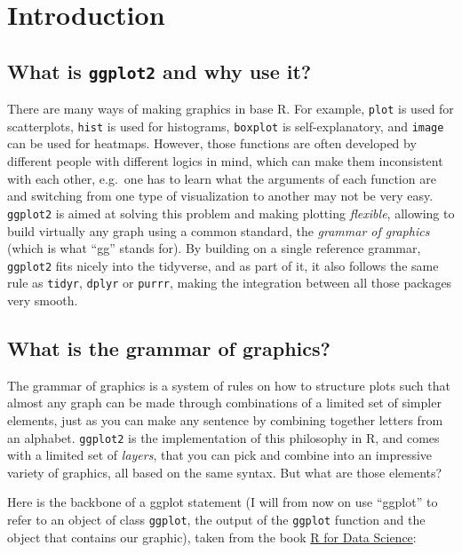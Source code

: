 \documentclass[]{book}
\begin{document}
\hypertarget{introduction}{%
\section{Introduction}\label{introduction}}

\hypertarget{what-is-ggplot2-and-why-use-it}{%
\subsection{\texorpdfstring{What is \texttt{ggplot2} and why use it?}{What is ggplot2 and why use it?}}\label{what-is-ggplot2-and-why-use-it}}

There are many ways of making graphics in base R. For example, \texttt{plot} is used for scatterplots, \texttt{hist} is used for histograms, \texttt{boxplot} is self-explanatory, and \texttt{image} can be used for heatmaps. However, those functions are often developed by different people with different logics in mind, which can make them inconsistent with each other, e.g.~one has to learn what the arguments of each function are and switching from one type of visualization to another may not be very easy. \texttt{ggplot2} is aimed at solving this problem and making plotting \emph{flexible}, allowing to build virtually any graph using a common standard, the \emph{grammar of graphics} (which is what ``gg'' stands for). By building on a single reference grammar, \texttt{ggplot2} fits nicely into the tidyverse, and as part of it, it also follows the same rule as \texttt{tidyr}, \texttt{dplyr} or \texttt{purrr}, making the integration between all those packages very smooth.

\hypertarget{what-is-the-grammar-of-graphics}{%
\subsection{What is the grammar of graphics?}\label{what-is-the-grammar-of-graphics}}

The grammar of graphics is a system of rules on how to structure plots such that almost any graph can be made through combinations of a limited set of simpler elements, just as you can make any sentence by combining together letters from an alphabet. \texttt{ggplot2} is the implementation of this philosophy in R, and comes with a limited set of \emph{layers}, that you can pick and combine into an impressive variety of graphics, all based on the same syntax. But what are those elements?

Here is the backbone of a ggplot statement (I will from now on use ``ggplot'' to refer to an object of class \texttt{ggplot}, the output of the \texttt{ggplot} function and the object that contains our graphic), taken from the book \href{https://r4ds.had.co.nz/}{R for Data Science}:
\end{document}
